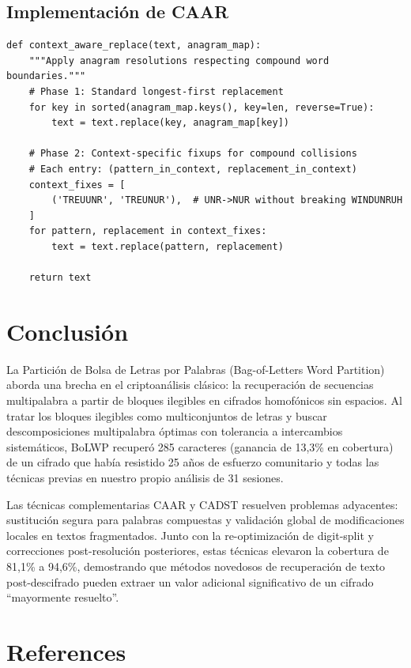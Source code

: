 \documentclass[11pt,a4paper]{article}
\begin{document}
\subsection{Implementación de CAAR}

\begin{lstlisting}[style=python]
def context_aware_replace(text, anagram_map):
    """Apply anagram resolutions respecting compound word boundaries."""
    # Phase 1: Standard longest-first replacement
    for key in sorted(anagram_map.keys(), key=len, reverse=True):
        text = text.replace(key, anagram_map[key])

    # Phase 2: Context-specific fixups for compound collisions
    # Each entry: (pattern_in_context, replacement_in_context)
    context_fixes = [
        ('TREUUNR', 'TREUNUR'),  # UNR->NUR without breaking WINDUNRUH
    ]
    for pattern, replacement in context_fixes:
        text = text.replace(pattern, replacement)

    return text
\end{lstlisting}

\section{Conclusión}

La Partición de Bolsa de Letras por Palabras (Bag-of-Letters Word Partition) aborda una brecha en el criptoanálisis clásico: la recuperación de secuencias multipalabra a partir de bloques ilegibles en cifrados homofónicos sin espacios. Al tratar los bloques ilegibles como multiconjuntos de letras y buscar descomposiciones multipalabra óptimas con tolerancia a intercambios sistemáticos, BoLWP recuperó 285 caracteres (ganancia de 13,3\% en cobertura) de un cifrado que había resistido 25 años de esfuerzo comunitario y todas las técnicas previas en nuestro propio análisis de 31 sesiones.

Las técnicas complementarias CAAR y CADST resuelven problemas adyacentes: sustitución segura para palabras compuestas y validación global de modificaciones locales en textos fragmentados. Junto con la re-optimización de digit-split y correcciones post-resolución posteriores, estas técnicas elevaron la cobertura de 81,1\% a 94,6\%, demostrando que métodos novedosos de recuperación de texto post-descifrado pueden extraer un valor adicional significativo de un cifrado ``mayormente resuelto''.

\section*{References}
\end{document}
